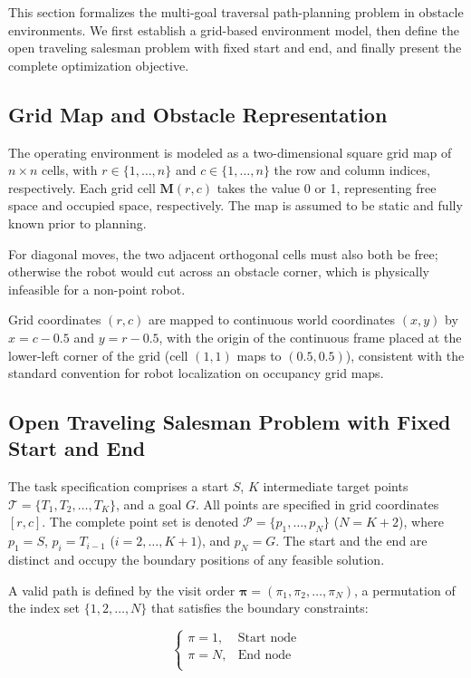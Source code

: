 This section formalizes the multi-goal traversal path-planning problem in obstacle environments. We first establish a grid-based environment model, then define the open traveling salesman problem with fixed start and end, and finally present the complete optimization objective.

\subsection{Grid Map and Obstacle Representation}

The operating environment is modeled as a two-dimensional square grid map of $n \times n$ cells, with $r \in \{1, \dots, n\}$ and $c \in \{1, \dots, n\}$ the row and column indices, respectively. Each grid cell $\mathbf{M}(r, c)$ takes the value 0 or 1, representing free space and occupied space, respectively. The map is assumed to be static and fully known prior to planning.

For diagonal moves, the two adjacent orthogonal cells must also both be free; otherwise the robot would cut across an obstacle corner, which is physically infeasible for a non-point robot.

Grid coordinates $(r, c)$ are mapped to continuous world coordinates $(x, y)$ by $x = c - 0.5$ and $y = r - 0.5$, with the origin of the continuous frame placed at the lower-left corner of the grid (cell $(1,1)$ maps to $(0.5, 0.5)$), consistent with the standard convention for robot localization on occupancy grid maps.

\subsection{Open Traveling Salesman Problem with Fixed Start and End}
\label{subsec:otspp}

The task specification comprises a start $S$, $K$ intermediate target points $\mathcal{T} = \{T_1, T_2, \dots, T_K\}$, and a goal $G$. All points are specified in grid coordinates $[r, c]$. The complete point set is denoted $\mathcal{P} = \{p_1, \dots, p_N\}$ ($N = K + 2$), where $p_1 = S$, $p_i = T_{i-1}$ ($i = 2, \dots, K+1$), and $p_N = G$. The start and the end are distinct and occupy the boundary positions of any feasible solution.

A valid path is defined by the visit order $\bm{\pi} = (\pi_1, \pi_2, \dots, \pi_N)$, a permutation of the index set $\{1, 2, \dots, N\}$ that satisfies the boundary constraints:

\begin{equation}
\begin{cases}
\pi = 1, & \text{Start node} \\
\pi = N, & \text{End node} \\
\end{cases}
\label{eq:boundary}
\end{equation}

